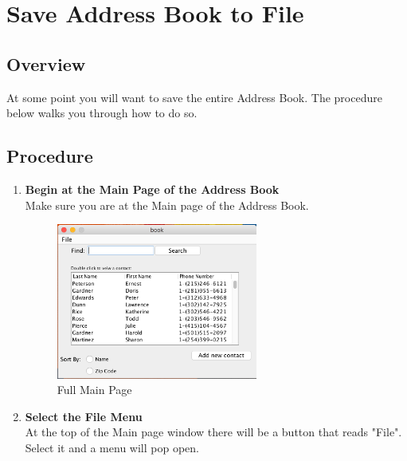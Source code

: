 \documentclass[a4paper, 11pt]{article}
\begin{document}
\clearpage

\section{Save Address Book to File}
\subsection{Overview}
At some point you will want to save the entire Address Book. The procedure below walks you through how to do so.
\subsection{Procedure}
\begin{enumerate}[label=\textbf{\arabic*})]
    \item{\textbf{Begin at the Main Page of the Address Book}}\\ Make sure you are at the Main page of the Address Book.
    
    \begin{figure}[h!]
    \centering
      \includegraphics[width=250]{main_page_full.png}
      \caption{Full Main Page}
    \end{figure}
    
    \item{\textbf{Select the File Menu}}\\ At the top of the Main page window there will be a button that reads "File". Select it and a menu will pop open.
    

\end{enumerate}
\end{document}
